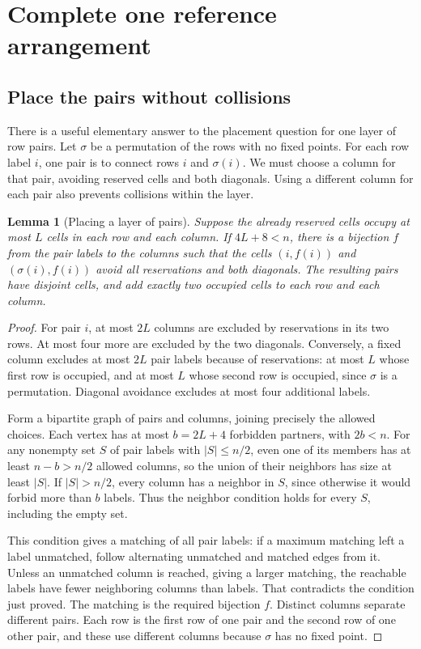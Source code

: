 \documentclass[11pt]{article}
\newtheorem{lemma}[theorem]{Lemma}
\theoremstyle{definition}
\begin{document}
\section{Complete one reference arrangement}\label{sec:reference}

\subsection{Place the pairs without collisions}

There is a useful elementary answer to the placement question for one layer
of row pairs. Let \(\sigma\) be a permutation of the rows with no fixed points.
For each row label \(i\), one pair is to connect rows \(i\) and \(\sigma(i)\).
We must choose a column for that pair, avoiding reserved cells and both diagonals.
Using a different column for each pair also prevents collisions within the layer.

\begin{lemma}[Placing a layer of pairs]\label{lem:layer}
Suppose the already reserved cells occupy at most \(L\) cells in each row and
each column. If \(4L+8<n\), there is a bijection \(f\) from the pair labels
to the columns such that the cells \((i,f(i))\) and \((\sigma(i),f(i))\) avoid
all reservations and both diagonals. The resulting pairs have disjoint cells,
and add exactly two occupied cells to each row and each column.
\end{lemma}
\begin{proof}
For pair \(i\), at most \(2L\) columns are excluded by reservations in its two
rows. At most four more are excluded by the two diagonals. Conversely, a
fixed column excludes at most \(2L\) pair labels because of reservations:
at most \(L\) whose first row is occupied, and at most \(L\) whose second row
is occupied, since \(\sigma\) is a permutation. Diagonal avoidance excludes
at most four additional labels.

Form a bipartite graph of pairs and columns, joining precisely the allowed
choices. Each vertex has at most \(b=2L+4\) forbidden partners, with \(2b<n\).
For any nonempty set \(S\) of pair labels with \(|S|\le n/2\), even one of its
members has at least \(n-b>n/2\) allowed columns, so the union of their
neighbors has size at least \(|S|\). If \(|S|>n/2\), every column has a neighbor
in \(S\), since otherwise it would forbid more than \(b\) labels. Thus the
neighbor condition holds for every \(S\), including the empty set.

This condition gives a matching of all pair labels: if a maximum matching
left a label unmatched, follow alternating unmatched and matched edges from
it. Unless an unmatched column is reached, giving a larger matching, the
reachable labels have fewer neighboring columns than labels. That contradicts
the condition just proved. The matching is the required bijection \(f\).
Distinct columns separate different pairs. Each row is the first row of one
pair and the second row of one other pair, and these use different columns
because \(\sigma\) has no fixed point.
\end{proof}
\end{document}
